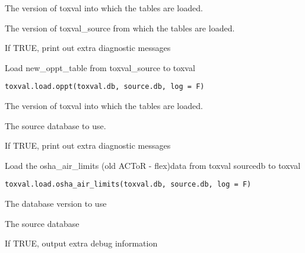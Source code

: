 \documentclass[letterpaper]{book}
\begin{document}
%
\begin{Arguments}
\begin{ldescription}
\item[\code{toxval.db}] The version of toxval into which the tables are loaded.

\item[\code{source.db}] The version of toxval\_source from which the tables are loaded.

\item[\code{verbose}] If TRUE, print out extra diagnostic messages
\end{ldescription}
\end{Arguments}
%
\begin{Description}\relax
Load new\_oppt\_table from toxval\_source to toxval
\end{Description}
%
\begin{Usage}
\begin{verbatim}
toxval.load.oppt(toxval.db, source.db, log = F)
\end{verbatim}
\end{Usage}
%
\begin{Arguments}
\begin{ldescription}
\item[\code{toxval.db}] The version of toxval into which the tables are loaded.

\item[\code{source.db}] The source database to use.

\item[\code{verbose}] If TRUE, print out extra diagnostic messages
\end{ldescription}
\end{Arguments}
%
\begin{Description}\relax
Load the osha\_air\_limits (old ACToR - flex)data  from toxval sourcedb to toxval
\end{Description}
%
\begin{Usage}
\begin{verbatim}
toxval.load.osha_air_limits(toxval.db, source.db, log = F)
\end{verbatim}
\end{Usage}
%
\begin{Arguments}
\begin{ldescription}
\item[\code{toxval.db}] The database version to use

\item[\code{source.db}] The source database

\item[\code{verbose}] If TRUE, output extra debug information
\end{ldescription}
\end{Arguments}
\end{document}
